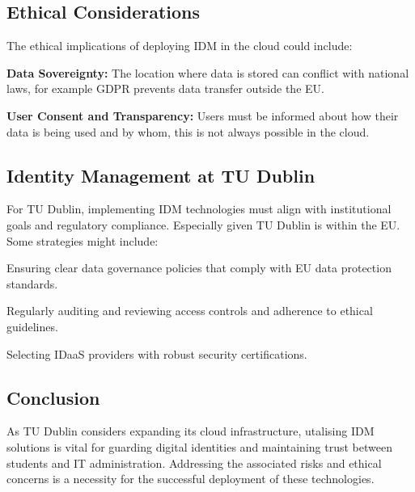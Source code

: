 \documentclass[10pt]{article}
\begin{document}
\subsection{Ethical Considerations}
The ethical implications of deploying IDM in the cloud could include:
\begin{description}[leftmargin=!,labelwidth=0pt,itemindent=0pt]
	\item[] \textbf{Data Sovereignty:} The location where data is stored can
	      conflict with national laws, for example GDPR prevents data transfer
	      outside the EU.\cite{gdpr-info}
	\item[] \textbf{User Consent and Transparency:} Users must be informed about
	      how their data is being used and by whom, this is not always possible
	      in the cloud.\cite{ahmadi2024cloud}
\end{description}
{\newpage}

\subsection{Identity Management at TU Dublin}
For TU Dublin, implementing IDM technologies must align with institutional goals
and regulatory compliance. Especially given TU Dublin is within the EU. Some
strategies might include:
\begin{description}[leftmargin=!,labelwidth=0pt,itemindent=0pt]
	\item[*] Ensuring clear data governance policies that comply with EU data
	      protection standards.
	\item[*] Regularly auditing and reviewing access controls and adherence to
	      ethical guidelines.
	\item[*] Selecting IDaaS providers with robust security certifications.
\end{description}
\vspace*{0.5cm}

\subsection{Conclusion}
As TU Dublin considers expanding its cloud infrastructure, utalising IDM
solutions is vital for guarding digital identities and maintaining trust between
students and IT administration. Addressing the associated risks and ethical
concerns is a necessity for the successful deployment of these technologies.
	{\newpage}
\end{document}
